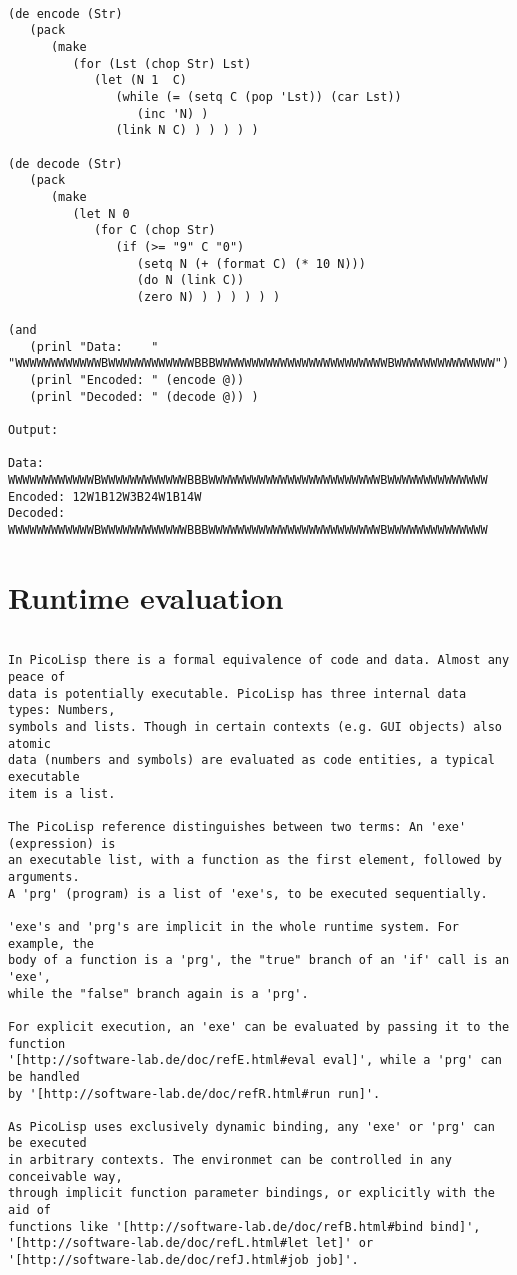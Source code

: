 \begin{verbatim}

(de encode (Str)
   (pack
      (make
         (for (Lst (chop Str) Lst)
            (let (N 1  C)
               (while (= (setq C (pop 'Lst)) (car Lst))
                  (inc 'N) )
               (link N C) ) ) ) ) )

(de decode (Str)
   (pack
      (make
         (let N 0
            (for C (chop Str)
               (if (>= "9" C "0")
                  (setq N (+ (format C) (* 10 N)))
                  (do N (link C))
                  (zero N) ) ) ) ) ) )

(and
   (prinl "Data:    " "WWWWWWWWWWWWBWWWWWWWWWWWWBBBWWWWWWWWWWWWWWWWWWWWWWWWBWWWWWWWWWWWWWW")
   (prinl "Encoded: " (encode @))
   (prinl "Decoded: " (decode @)) )

Output:

Data:    WWWWWWWWWWWWBWWWWWWWWWWWWBBBWWWWWWWWWWWWWWWWWWWWWWWWBWWWWWWWWWWWWWW
Encoded: 12W1B12W3B24W1B14W
Decoded: WWWWWWWWWWWWBWWWWWWWWWWWWBBBWWWWWWWWWWWWWWWWWWWWWWWWBWWWWWWWWWWWWWW

\end{verbatim}

\section*{Runtime evaluation}

\begin{verbatim}

In PicoLisp there is a formal equivalence of code and data. Almost any peace of
data is potentially executable. PicoLisp has three internal data types: Numbers,
symbols and lists. Though in certain contexts (e.g. GUI objects) also atomic
data (numbers and symbols) are evaluated as code entities, a typical executable
item is a list.

The PicoLisp reference distinguishes between two terms: An 'exe' (expression) is
an executable list, with a function as the first element, followed by arguments.
A 'prg' (program) is a list of 'exe's, to be executed sequentially.

'exe's and 'prg's are implicit in the whole runtime system. For example, the
body of a function is a 'prg', the "true" branch of an 'if' call is an 'exe',
while the "false" branch again is a 'prg'.

For explicit execution, an 'exe' can be evaluated by passing it to the function
'[http://software-lab.de/doc/refE.html#eval eval]', while a 'prg' can be handled
by '[http://software-lab.de/doc/refR.html#run run]'.

As PicoLisp uses exclusively dynamic binding, any 'exe' or 'prg' can be executed
in arbitrary contexts. The environmet can be controlled in any conceivable way,
through implicit function parameter bindings, or explicitly with the aid of
functions like '[http://software-lab.de/doc/refB.html#bind bind]',
'[http://software-lab.de/doc/refL.html#let let]' or
'[http://software-lab.de/doc/refJ.html#job job]'.

\end{verbatim}


